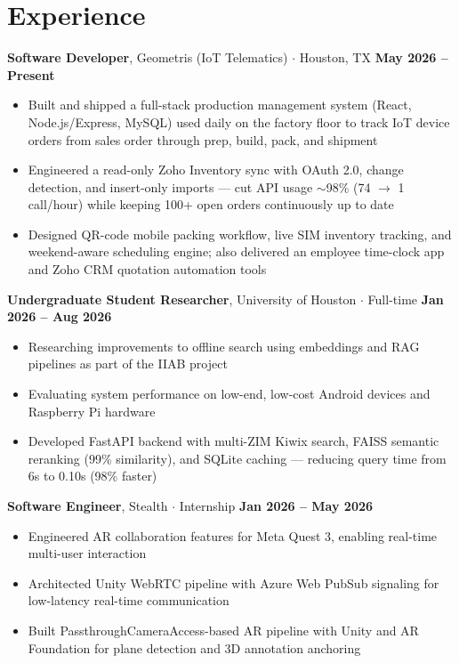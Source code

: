 \documentclass[9.5pt, letterpaper]{article}
\begin{document}
\section{Experience}
\textbf{Software Developer}, Geometris (IoT Telematics) $\cdot$ Houston, TX \hfill \textbf{May 2026 -- Present}
\begin{itemize}[leftmargin=0.5cm, itemsep=0.05cm, topsep=0.05cm, parsep=0pt]
    \item Built and shipped a full-stack production management system (React, Node.js/Express, MySQL) used daily on the factory floor to track IoT device orders from sales order through prep, build, pack, and shipment
    \item Engineered a read-only Zoho Inventory sync with OAuth 2.0, change detection, and insert-only imports --- cut API usage $\sim$98\% (74 $\rightarrow$ 1 call/hour) while keeping 100+ open orders continuously up to date
    \item Designed QR-code mobile packing workflow, live SIM inventory tracking, and weekend-aware scheduling engine; also delivered an employee time-clock app and Zoho CRM quotation automation tools
\end{itemize}
\vspace{0.05cm}
\textbf{Undergraduate Student Researcher}, University of Houston $\cdot$ Full-time \hfill \textbf{Jan 2026 -- Aug 2026}
\begin{itemize}[leftmargin=0.5cm, itemsep=0.05cm, topsep=0.05cm, parsep=0pt]
    \item Researching improvements to offline search using embeddings and RAG pipelines as part of the IIAB project
    \item Evaluating system performance on low-end, low-cost Android devices and Raspberry Pi hardware
    \item Developed FastAPI backend with multi-ZIM Kiwix search, FAISS semantic reranking (99\% similarity), and SQLite caching --- reducing query time from 6s to 0.10s (98\% faster)
\end{itemize}
\vspace{0.05cm}
\textbf{Software Engineer}, Stealth $\cdot$ Internship \hfill \textbf{Jan 2026 -- May 2026}
\begin{itemize}[leftmargin=0.5cm, itemsep=0.05cm, topsep=0.05cm, parsep=0pt]
    \item Engineered AR collaboration features for Meta Quest 3, enabling real-time multi-user interaction
    \item Architected Unity WebRTC pipeline with Azure Web PubSub signaling for low-latency real-time communication
    \item Built PassthroughCameraAccess-based AR pipeline with Unity and AR Foundation for plane detection and 3D annotation anchoring
\end{itemize}
\end{document}
